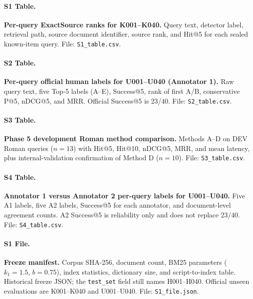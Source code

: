 \documentclass[10pt,letterpaper]{article}
\begin{document}
\paragraph*{S1 Table.}
\label{S1_Table}
\textbf{Per-query ExactSource ranks for K001--K040.} Query text, detector label, retrieval path, source document identifier, source rank, and Hit@5 for each sealed known-item query. File: \texttt{S1\_table.csv}.

\paragraph*{S2 Table.}
\label{S2_Table}
\textbf{Per-query official human labels for U001--U040 (Annotator 1).} Raw query text, five Top-5 labels (A--E), Success@5, rank of first A/B, conservative P@5, nDCG@5, and MRR. Official Success@5 is 23/40. File: \texttt{S2\_table.csv}.

\paragraph*{S3 Table.}
\label{S3_Table}
\textbf{Phase 5 development Roman method comparison.} Methods A--D on DEV Roman queries ($n = 13$) with Hit@5, Hit@10, nDCG@5, MRR, and mean latency, plus internal-validation confirmation of Method D ($n = 10$). File: \texttt{S3\_table.csv}.

\paragraph*{S4 Table.}
\label{S4_Table}
\textbf{Annotator 1 versus Annotator 2 per-query labels for U001--U040.} Five A1 labels, five A2 labels, Success@5 for each annotator, and document-level agreement counts. A2 Success@5 is reliability only and does not replace 23/40. File: \texttt{S4\_table.csv}.

\paragraph*{S1 File.}
\label{S1_File}
\textbf{Freeze manifest.} Corpus SHA-256, document count, BM25 parameters ($k_1 = 1.5$, $b = 0.75$), index statistics, dictionary size, and script-to-index table. Historical freeze JSON; the \texttt{test\_set} field still names H001--H040. Official unseen evaluations are K001--K040 and U001--U040. File: \texttt{S1\_file.json}.
\end{document}
